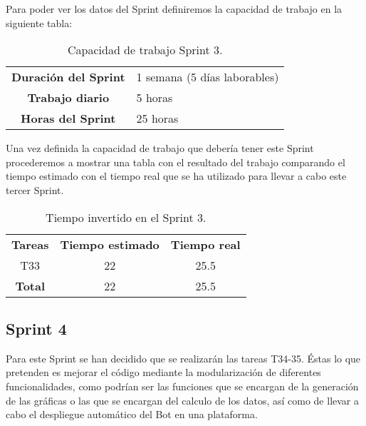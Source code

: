 Para poder ver los datos del Sprint definiremos la capacidad de trabajo en la siguiente tabla:

\begin{table}[H]
	\begin{center}
		\begin{tabular}{| c | p{9cm} |}
			\hline

			\textbf{Duración del Sprint} & 1 semana (5 días laborables) \\
			\textbf{Trabajo diario} & 5 horas \\
			\textbf{Horas del Sprint} & 25 horas \\ \hline
		\end{tabular}
		\caption{Capacidad de trabajo Sprint 3.}

	\end{center}
\end{table}

Una vez definida la capacidad de trabajo que debería tener este Sprint procederemos a mostrar una tabla con el resultado del trabajo comparando el tiempo estimado con el tiempo real que se ha utilizado para llevar a cabo este tercer Sprint.

\begin{table}[H]
	\begin{center}
		\begin{tabular}{| c | c | c |}
			\hline

			\textbf{Tareas} & \textbf{Tiempo estimado} & \textbf{Tiempo real} \\
			T33 & 22 & 25.5 \\
			\textbf{Total} & 22 & 25.5 \\ \hline
		\end{tabular}
		\caption{Tiempo invertido en el Sprint 3.}
	\end{center}
\end{table}

\subsection{Sprint 4}

Para este Sprint se han decidido que se realizarán las tareas T34-35. Éstas lo que pretenden es mejorar el código mediante la modularización de diferentes funcionalidades, como podrían ser las funciones que se encargan de la generación de las gráficas o las que se encargan del calculo de los datos, así como de llevar a cabo el despliegue automático del Bot en una plataforma.

